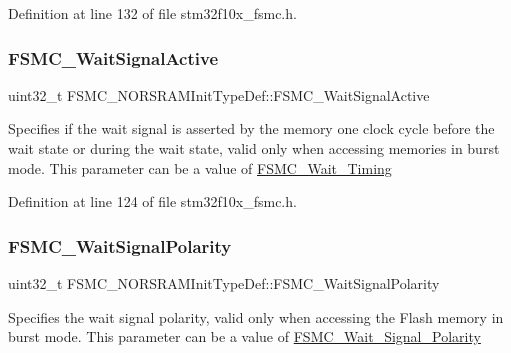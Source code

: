 Definition at line 132 of file stm32f10x\+\_\+fsmc.\+h.

\mbox{\label{struct_f_s_m_c___n_o_r_s_r_a_m_init_type_def_a71c6e7cc8e7e1a8fd0562960ffd23e88}} 
\subsubsection{\texorpdfstring{F\+S\+M\+C\+\_\+\+Wait\+Signal\+Active}{FSMC\_WaitSignalActive}}
{\footnotesize\ttfamily uint32\+\_\+t F\+S\+M\+C\+\_\+\+N\+O\+R\+S\+R\+A\+M\+Init\+Type\+Def\+::\+F\+S\+M\+C\+\_\+\+Wait\+Signal\+Active}

Specifies if the wait signal is asserted by the memory one clock cycle before the wait state or during the wait state, valid only when accessing memories in burst mode. This parameter can be a value of \hyperlink{group___f_s_m_c___wait___timing}{F\+S\+M\+C\+\_\+\+Wait\+\_\+\+Timing} 

Definition at line 124 of file stm32f10x\+\_\+fsmc.\+h.

\mbox{\label{struct_f_s_m_c___n_o_r_s_r_a_m_init_type_def_a5d4d76594fc201943b51095e3ef34791}} 
\subsubsection{\texorpdfstring{F\+S\+M\+C\+\_\+\+Wait\+Signal\+Polarity}{FSMC\_WaitSignalPolarity}}
{\footnotesize\ttfamily uint32\+\_\+t F\+S\+M\+C\+\_\+\+N\+O\+R\+S\+R\+A\+M\+Init\+Type\+Def\+::\+F\+S\+M\+C\+\_\+\+Wait\+Signal\+Polarity}

Specifies the wait signal polarity, valid only when accessing the Flash memory in burst mode. This parameter can be a value of \hyperlink{group___f_s_m_c___wait___signal___polarity}{F\+S\+M\+C\+\_\+\+Wait\+\_\+\+Signal\+\_\+\+Polarity} 


